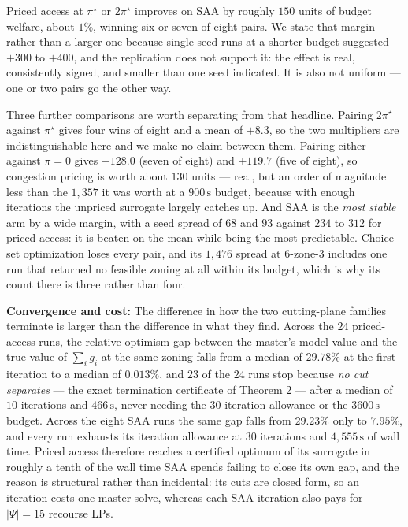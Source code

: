 \documentclass{article}
\begin{document}
Priced access at $\pi^\star$ or $2\pi^\star$ improves on SAA by roughly $150$ units of budget welfare, about $1\%$, winning six or seven of eight pairs. We state that margin rather than a larger one because single-seed runs at a shorter budget suggested $+300$ to $+400$, and the replication does not support it: the effect is real, consistently signed, and smaller than one seed indicated. It is also not uniform --- one or two pairs go the other way.

Three further comparisons are worth separating from that headline. Pairing $2\pi^\star$ against $\pi^\star$ gives four wins of eight and a mean of $+8.3$, so the two multipliers are indistinguishable here and we make no claim between them. Pairing either against $\pi = 0$ gives $+128.0$ (seven of eight) and $+119.7$ (five of eight), so congestion pricing is worth about $130$ units --- real, but an order of magnitude less than the $1{,}357$ it was worth at a $900\,\mathrm{s}$ budget, because with enough iterations the unpriced surrogate largely catches up. And SAA is the \emph{most stable} arm by a wide margin, with a seed spread of $68$ and $93$ against $234$ to $312$ for priced access: it is beaten on the mean while being the most predictable. Choice-set optimization loses every pair, and its $1{,}476$ spread at 6-zone-3 includes one run that returned no feasible zoning at all within its budget, which is why its count there is three rather than four.

\noindent\textbf{Convergence and cost:}
The difference in how the two cutting-plane families terminate is larger than the difference in what they find. Across the $24$ priced-access runs, the relative optimism gap between the master's model value and the true value of $\sum_i g_i$ at the same zoning falls from a median of $29.78\%$ at the first iteration to a median of $0.013\%$, and $23$ of the $24$ runs stop because \emph{no cut separates} --- the exact termination certificate of Theorem 2 --- after a median of $10$ iterations and $466\,\mathrm{s}$, never needing the $30$-iteration allowance or the $3600\,\mathrm{s}$ budget. Across the eight SAA runs the same gap falls from $29.23\%$ only to $7.95\%$, and every run exhausts its iteration allowance at $30$ iterations and $4{,}555\,\mathrm{s}$ of wall time. Priced access therefore reaches a certified optimum of its surrogate in roughly a tenth of the wall time SAA spends failing to close its own gap, and the reason is structural rather than incidental: its cuts are closed form, so an iteration costs one master solve, whereas each SAA iteration also pays for $|\Psi| = 15$ recourse LPs.
\end{document}
